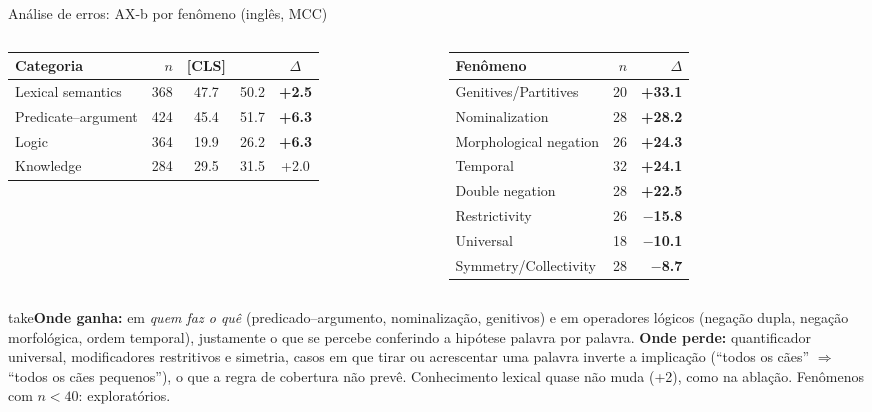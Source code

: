 \documentclass[aspectratio=169,10pt]{beamer}
\newcommand{\up}[1]{\textcolor{logic}{\textbf{#1}}}
\newcommand{\down}[1]{\textcolor{relneg}{\textbf{#1}}}
\newcommand{\take}[1]{\vspace{4pt}\begin{beamercolorbox}[sep=5pt,rounded=true]{take}\small #1\end{beamercolorbox}}
\begin{document}
\begin{frame}{Análise de erros: AX-b por fenômeno (inglês, MCC)}
\begin{columns}[T]
\small
\begin{tabular}{@{}lrccc@{}}
\toprule
Categoria & $n$ & [CLS] & \model{} & $\Delta$ \\
\midrule
Lexical semantics & 368 & 47.7 & 50.2 & \up{+2.5} \\
Predicate--argument & 424 & 45.4 & 51.7 & \up{+6.3} \\
Logic & 364 & 19.9 & 26.2 & \up{+6.3} \\
Knowledge & 284 & 29.5 & 31.5 & +2.0 \\
\bottomrule
\end{tabular}
\small
\begin{tabular}{@{}lrr@{}}
\toprule
Fenômeno & $n$ & $\Delta$ \\
\midrule
Genitives/Partitives & 20 & \up{+33.1} \\
Nominalization & 28 & \up{+28.2} \\
Morphological negation & 26 & \up{+24.3} \\
Temporal & 32 & \up{+24.1} \\
Double negation & 28 & \up{+22.5} \\
\midrule
Restrictivity & 26 & \down{$-$15.8} \\
Universal & 18 & \down{$-$10.1} \\
Symmetry/Collectivity & 28 & \down{$-$8.7} \\
\bottomrule
\end{tabular}
\end{columns}
\take{\textbf{Onde ganha:} em \emph{quem faz o quê} (predicado--argumento, nominalização, genitivos) e em operadores lógicos (negação dupla, negação morfológica, ordem temporal), justamente o que se percebe conferindo a hipótese palavra por palavra.
\textbf{Onde perde:} quantificador universal, modificadores restritivos e simetria, casos em que tirar ou acrescentar uma palavra inverte a implicação (``todos os cães'' $\Rightarrow$ ``todos os cães pequenos''), o que a regra de cobertura não prevê.
Conhecimento lexical quase não muda (+2), como na ablação. {\scriptsize Fenômenos com $n<40$: exploratórios.}}
\end{frame}

\end{document}
